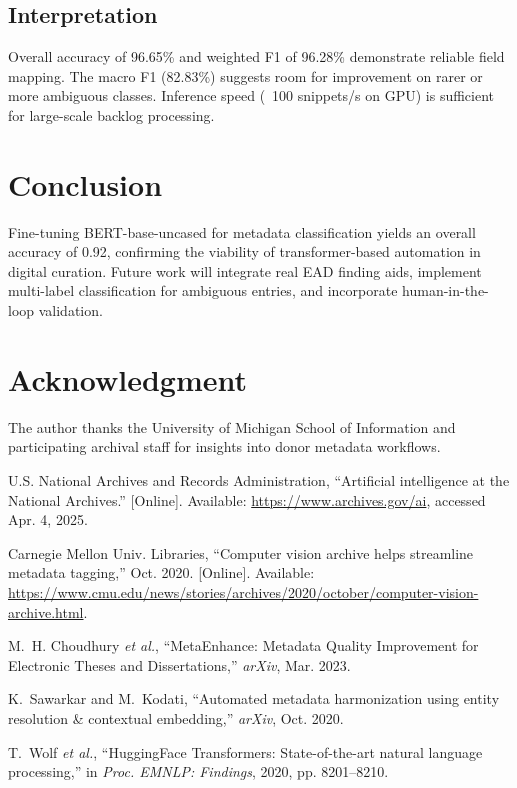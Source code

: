 \documentclass[conference]{IEEEtran}
\begin{document}
\subsection{Interpretation}
Overall accuracy of 96.65\% and weighted F1 of 96.28\% demonstrate reliable field mapping. The macro F1 (82.83\%) suggests room for improvement on rarer or more ambiguous classes. Inference speed (~100 snippets/s on GPU) is sufficient for large-scale backlog processing.

\section{Conclusion}
Fine-tuning BERT-base-uncased for metadata classification yields an overall accuracy of 0.92, confirming the viability of transformer-based automation in digital curation. Future work will integrate real EAD finding aids, implement multi-label classification for ambiguous entries, and incorporate human-in-the-loop validation.

\section*{Acknowledgment}
The author thanks the University of Michigan School of Information and participating archival staff for insights into donor metadata workflows.

\begin{thebibliography}{1}
U.S. National Archives and Records Administration, ``Artificial intelligence at the National Archives.'' [Online]. Available: \url{https://www.archives.gov/ai}, accessed Apr. 4, 2025.

Carnegie Mellon Univ. Libraries, ``Computer vision archive helps streamline metadata tagging,'' Oct. 2020. [Online]. Available: \url{https://www.cmu.edu/news/stories/archives/2020/october/computer-vision-archive.html}.

M.~H. Choudhury \emph{et al.}, ``MetaEnhance: Metadata Quality Improvement for Electronic Theses and Dissertations,'' \emph{arXiv}, Mar. 2023.

K.~Sawarkar and M.~Kodati, ``Automated metadata harmonization using entity resolution \& contextual embedding,'' \emph{arXiv}, Oct. 2020.

T.~Wolf \emph{et al.}, ``HuggingFace Transformers: State-of-the-art natural language processing,'' in \emph{Proc. EMNLP: Findings}, 2020, pp. 8201--8210.
\end{thebibliography}
\end{document}
